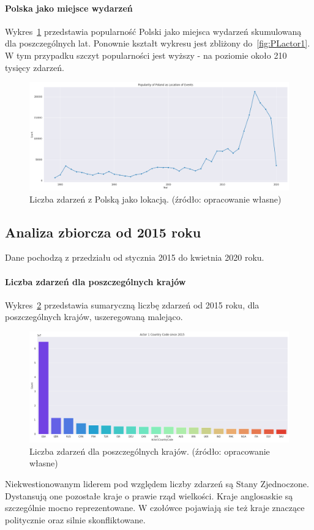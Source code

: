 \documentclass[11pt]{report}
\begin{document}
    \paragraph{Polska jako miejsce wydarzeń}
    Wykres~\ref{fig:PLlocation} przedstawia popularność Polski jako miejsca wydarzeń skumulowaną dla poszczególnych lat. Ponownie kształt wykresu jest zbliżony do~\ref{fig:PLactor1}. W tym przypadku szczyt popularności jest wyższy - na poziomie około 210 tysięcy zdarzeń.
    \begin{figure}[!htp]
        \centering
        \includegraphics[width=\linewidth]{fig/PL/PLlocation.png}
        \caption{Liczba zdarzeń z Polską jako lokacją. (źródło: opracowanie własne)}
        \label{fig:PLlocation}
    \end{figure}

    \subsection{Analiza zbiorcza od 2015 roku}
    Dane pochodzą z przedziału od stycznia 2015 do kwietnia 2020 roku.

    \paragraph{Liczba zdarzeń dla poszczególnych krajów}
    Wykres~\ref{fig:GLOBALactor1} przedstawia sumaryczną liczbę zdarzeń od 2015 roku, dla poszczególnych krajów, uszeregowaną malejąco.
    \begin{figure}[!htp]
        \centering
        \includegraphics[width=\linewidth]{fig/GLOBAL/Actor1.png}
        \caption{Liczba zdarzeń dla poszczególnych krajów. (źródło: opracowanie własne)}
        \label{fig:GLOBALactor1}
    \end{figure}
    Niekwestionowanym liderem pod względem liczby zdarzeń są Stany Zjednoczone. Dystansują one pozostałe kraje o prawie rząd wielkości.
    Kraje anglosaskie są szczególnie mocno reprezentowane.
    W czołówce pojawiają sie też kraje znaczące politycznie oraz silnie skonfliktowane.
\end{document}

